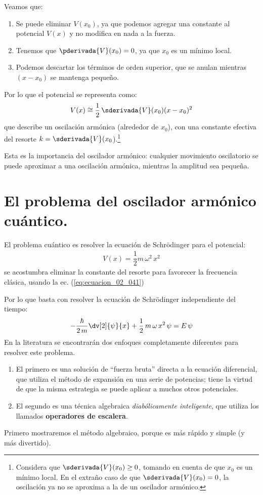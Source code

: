Veamos que:
\begin{enumerate}
\item Se puede eliminar $V(x_{0})$, ya que podemos agregar una constante al potencial $V(x)$ y no modifica en nada a la fuerza.
\item Tenemos que $\pderivada{V}(x_{0}) = 0$, ya que $x_{0}$ es un mínimo local.
\item Podemos descartar los términos de orden superior, que se anulan mientras $(x - x_{0})$ se mantenga pequeño.
\end{enumerate}
Por lo que el potencial se representa como:
\begin{align*}
V(x) \cong \dfrac{1}{2} \, \sderivada{V} (x_{0}) (x - x_{0})^{2}
\end{align*}
que describe un oscilación armónica (alrededor de $x_{0}$), con una constante efectiva del resorte $k = \sderivada{V} (x_{0}$).\footnote{Considera que $\sderivada{V}(x_{0})\geq 0$, tomando en cuenta de que $x_{0}$ es un mínimo local. En el extraño caso de que $\sderivada{V} (x_{0})= 0$, la oscilación ya no se aproxima a la de un oscilador armónico.}
\par
Esta es la importancia del oscilador armónico: cualquier movimiento oscilatorio se puede aproximar a una oscilación armónica, mientras la amplitud sea pequeña.

\section{El problema del oscilador armónico cuántico.}

El problema cuántico es resolver la ecuación de Schrödinger para el potencial:
\begin{align}
V(x) = \dfrac{1}{2} m \, \omega^{2} \, x^{2}
\label{eq:ecuacion_02_043}
\end{align}
se acostumbra eliminar la constante del resorte para favorecer la frecuencia clásica, usando la ec. (\ref{eq:ecuacion_02_041})
\par
Por lo que basta con resolver la ecuación de Schrödinger independiente del tiempo:
\begin{align}
- \dfrac{\hbar}{2 \, m} \dv[2]{\psi}{x} + \dfrac{1}{2} \, m \, \omega \, x^{2} \, \psi = E \, \psi
\label{eq:ecuacion_02_044}
\end{align}
En la literatura se encontrarán dos enfoques completamente diferentes para resolver este problema.
\begin{enumerate}
\item El primero es una solución de \enquote{fuerza bruta} directa a la ecuación diferencial, que utiliza el método de expansión en una serie de potencias; tiene la virtud de que la misma estrategia se puede aplicar a muchos otros potenciales.
\item El segundo es una técnica algebraica \emph{diabólicamente inteligente}, que utiliza los llamados \textbf{operadores de escalera}.
\end{enumerate}
Primero mostraremos el método algebraico, porque es más rápido y simple (y más divertido).

